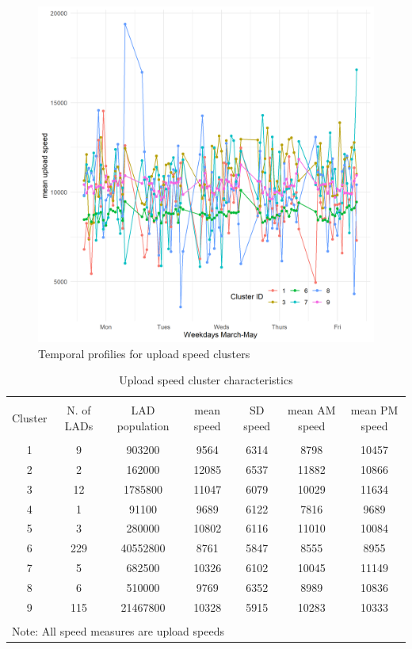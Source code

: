 \documentclass[]{interact}
\theoremstyle{plain}%
\theoremstyle{definition}
\theoremstyle{remark}
\begin{document}
\begin{figure}
\includegraphics[width=0.95\linewidth]{figures/UpCluster} \caption{\label{UpCluster}Temporal profilies for upload speed clusters}\label{fig:unnamed-chunk-2}
\end{figure}

\begin{table}[!htbp] \centering 
  \caption{Upload speed cluster characteristics\label{up.cluster.descr}} 
  \label{} 
\footnotesize 
\begin{tabular}{@{\extracolsep{0pt}} ccccccc} 
\\[-1.8ex]\hline 
\hline \\[-1.8ex] 
Cluster & N. of LADs & LAD population & mean speed & SD speed & mean AM speed & mean PM speed \\ 
\hline \\[-1.8ex] 
1 & 9 & 903200 & 9564 & 6314 & 8798 & 10457 \\ 
2 & 2 & 162000 & 12085 & 6537 & 11882 & 10866 \\ 
3 & 12 & 1785800 & 11047 & 6079 & 10029 & 11634 \\ 
4 & 1 & 91100 & 9689 & 6122 & 7816 & 9689 \\ 
5 & 3 & 280000 & 10802 & 6116 & 11010 & 10084 \\ 
6 & 229 & 40552800 & 8761 & 5847 & 8555 & 8955 \\ 
7 & 5 & 682500 & 10326 & 6102 & 10045 & 11149 \\ 
8 & 6 & 510000 & 9769 & 6352 & 8989 & 10836 \\ 
9 & 115 & 21467800 & 10328 & 5915 & 10283 & 10333 \\ 
\hline \\[-1.8ex] 
\multicolumn{7}{l}{Note: All speed measures are upload speeds} \\ 
\end{tabular} 
\end{table}
\end{document}

